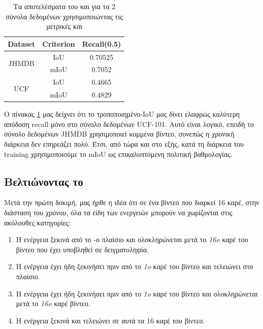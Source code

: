 \en
\begin{table}[h]
  \centering
  \begin{tabular}{|| c | c || c ||}
    \hline
    \textbf{Dataset} & \textbf{Criterion} & \textbf{Recall(0.5)} \\
    \hline  \hline
    \multirow{2}{4em}{JHMDB} & IoU & 0.70525 \\
    \cline{2-3}
    {} & mIoU & 0.7052 \\
    \hline
    \multirow{2}{4em}{UCF} & IoU & 0.4665 \\
    \cline{2-3}
    {} & mIoU & 0.4829 \\
    \hline      
  \end{tabular}
  \caption{\gr Τα αποτελέσματα του  και για τα 2 σύνολα δεδομένων
    χρησιμοποιώντας τις μετρικές  και }

  \label{table:gr_iou_miou}
\end{table}
\gr

Ο πίνακας  \ref{table:gr_iou_miou} μας δείχνει ότι το τροποποιημένο-\en IoU \gr μας δίνει ελαφρώς καλύτερη απόδοση \en recall \gr μόνο στο σύνολο δεδομένων \en UCF-101\gr.
Αυτό είναι λογικό, επειδή το σύνολο δεδομένων \en JHMDB \gr χρησιμοποιεί κομμένα βίντεο, συνεπώς  η χρονική διάρκεια δεν επηρεάζει πολύ. Έτσι, από τώρα και στο εξής,
κατά τη διάρκεια του \en training \gr χρησιμοποιούμε το \en mIoU  \gr ως επικαλυπτόμενη πολιτική βαθμολογίας.

\subsection{Βελτιώνοντας το  }
\gr Μετά την πρώτη δοκιμή, μας ήρθε η  ιδέα ότι σε ένα βίντεο που διαρκεί 16 καρέ, στην διάσταση του χρόνου, όλα τα είδη των ενεργειών μπορούν να χωρίζονται στις ακόλουθες κατηγορίες:
\begin{enumerate}
\item Η ενέργεια ξεκινά από το -ο πλαίσιο και ολοκληρώνεται μετά το \textit{16o} καρέ του βίντεο που έχει υποβληθεί σε δειγματοληψία.
\item Η ενέργεια έχει ήδη ξεκινήσει πριν από το \textit{1o} καρέ του βίντεο και τελειώνει στο  πλαίσιο.
\item Η ενέργεια έχει ήδη ξεκινήσει πριν από το \textit{1o} καρέ του βίντεο και ολοκληρώνεται μετά το \textit{16o} καρέ βίντεο.
\item Η ενέργεια ξεκινά και τελειώνει σε αυτά τα 16 καρέ του βίντεο.
\end{enumerate}

